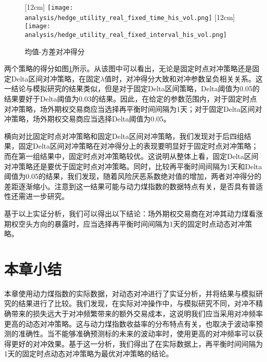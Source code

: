 \begin{figure}[htb]
  \centering
  [12cm]
    {\texttt{[image: analysis/hedge\_utility\_real\_fixed\_time\_his\_vol.png]}}
  \hspace{0.5cm}
  [12cm]
    {\texttt{[image: analysis/hedge\_utility\_real\_fixed\_interval\_his\_vol.png]}}
    \caption[这里将出现在插图索引中]
    {均值-方差对冲得分}
  \label{fig:hedge_utility_real}
\end{figure}

两个策略的得分如图\ref{fig:hedge_utility_real}所示。从该图中可以看出，无论是固定时点对冲策略还是固定Delta区间对冲策略，在固定$\lambda$值时，对冲得分大致和对冲参数呈负相关关系。这一结论与模拟研究的结果类似，但是对于固定Delta区间策略，Delta阈值为0.05的结果要好于Delta阈值为0.03的结果。因此，在给定的参数范围内，对于固定时点对冲策略，场外期权交易商应当选择再平衡时间间隔为1天；对于固定Delta区间对冲策略，场外期权交易商应当选择Delta阈值为0.05。

横向对比固定时点对冲策略和固定Delta区间对冲策略，我们发现对于后四组结果，固定Delta区间对冲策略在对冲得分上的表现要明显好于固定时点对冲策略；而在第一组结果中，固定时点对冲策略较优。这说明从整体上看，固定Delta区间对冲策略还是要优于固定时点对冲策略。同时，比较再平衡时间间隔为1天和Delta阈值为0.05的结果，我们发现，随着风险厌恶系数绝对值的增加，两者对冲得分的差距逐渐缩小。注意到这一结果可能与动力煤指数的数据特点有关，是否具有普适性还需进一步研究。

基于以上实证分析，我们可以得出以下结论：场外期权交易商在对冲其动力煤看涨期权空头方向的暴露时，应当选择再平衡时间间隔为1天的固定时点动态对冲策略。

\section{本章小结}

本章使用动力煤指数的实际数据，对动态对冲进行了实证分析，并将结果与模拟研究的结果进行了比较。我们发现，在实际对冲操作中，与模拟研究不同，对冲不精确带来的损失远大于对冲频繁带来的额外交易成本，这说明我们应当采用对冲频率更高的动态对冲策略。这与动力煤指数收益率的分布特点有关，也取决于波动率预测的准确性。当不能够准确预测标的未来的波动率时，使用更高的对冲频率可以获得更好的对冲效果。基于这一分析，我们得出了在实际数据上，再平衡时间间隔为1天的固定时点动态对冲策略为最优对冲策略的结论。
